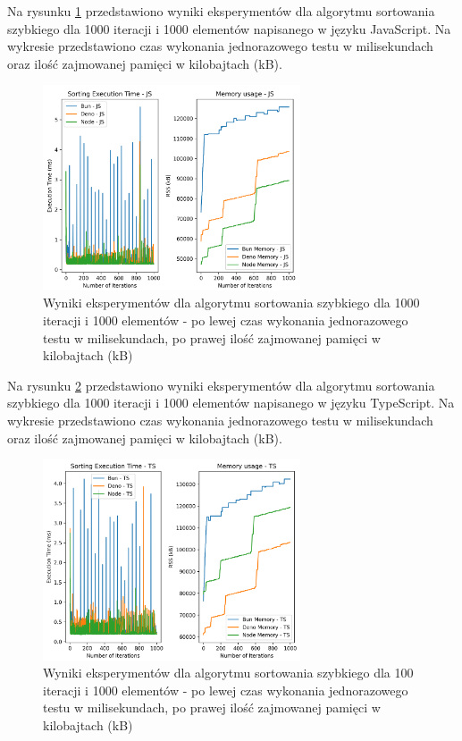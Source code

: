 Na rysunku \ref{fig:quick_sorting_e3} przedstawiono wyniki eksperymentów dla algorytmu sortowania szybkiego dla 1000 iteracji i 1000 elementów napisanego w języku JavaScript. Na wykresie przedstawiono czas wykonania jednorazowego testu w milisekundach oraz ilość zajmowanej pamięci w kilobajtach (kB).

\begin{figure}[H]
  \centering
  \includegraphics[width=0.68\textwidth]{Figures/sorting/sorting_quick_1000_1000_js.png}
  \caption{Wyniki eksperymentów dla algorytmu sortowania szybkiego dla 1000 iteracji i 1000 elementów - po lewej czas wykonania jednorazowego testu w milisekundach, po prawej ilość zajmowanej pamięci w kilobajtach (kB)}
  \label{fig:quick_sorting_e3}
\end{figure}

Na rysunku \ref{fig:quick_sorting_e3_ts} przedstawiono wyniki eksperymentów dla algorytmu sortowania szybkiego dla 1000 iteracji i 1000 elementów napisanego w języku TypeScript. Na wykresie przedstawiono czas wykonania jednorazowego testu w milisekundach oraz ilość zajmowanej pamięci w kilobajtach (kB).

\begin{figure}[H]
  \centering
  \includegraphics[width=0.68\textwidth]{Figures/sorting/sorting_quick_1000_1000_ts.png}
  \caption{Wyniki eksperymentów dla algorytmu sortowania szybkiego dla 100 iteracji i 1000 elementów - po lewej czas wykonania jednorazowego testu w milisekundach, po prawej ilość zajmowanej pamięci w kilobajtach (kB)}
  \label{fig:quick_sorting_e3_ts}
\end{figure}


